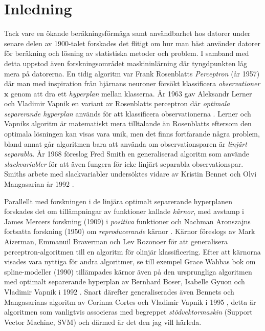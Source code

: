 \documentclass[a4paper, 12pt]{report}
\theoremstyle{definition}
\theoremstyle{remark}
\begin{document}
\chapter{Inledning}
Tack vare en ökande beräkningsförmåga samt användbarhet hos datorer under senare delen av 1900-talet forskades det flitigt om hur man bäst använder datorer för beräkning och lösning av statistiska metoder och problem.
I samband med detta uppstod även forskningsområdet maskininlärning där tyngdpunkten låg mera på datorerna.
En tidig algoritm var Frank Rosenblatts \emph{Perceptron} (år 1957) \cite{Rosenblatt} där man med inspiration från hjärnans neuroner försökt klassificera \emph{observationer} $\mathbf{x}$ genom att dra ett \emph{hyperplan} mellan klasserna.
År 1963 gav Aleksandr Lerner och Vladimir Vapnik en variant av Rosenblatts perceptron där \emph{optimala separerande hyperplan} används för att klassificera observationerna \cite{VapnikLerner1963}.
Lerner och Vapniks algoritm är matematiskt mera tilltalande än Rosenblatts eftersom den optimala lösningen kan visas vara unik, men det finns fortfarande några problem, bland annat går algoritmen bara att använda om observationsparen är \emph{linjärt separabla}.
År 1968 föreslog Fred Smith \cite{Smith} en generaliserad algoritm som använde \emph{slackvariabler} för att även fungera för icke linjärt separabla observationspar.
Smiths arbete med slackvariabler undersöktes vidare av Kristin Bennet och Olvi Mangasarian år 1992 \cite{BennetMangasarian}.

Parallellt med forskningen i de linjära optimalt separerande hyperplanen forskades det om tillämpningar av funktioner kallade \emph{kärnor}, med avstamp i James Mercers forskning (1909) i \emph{positiva} funktioner \cite{Mercer} och Nachman Aronszajns fortsatta forskning (1950) om \emph{reproducerande} kärnor \cite{Aronszajn}.
Kärnor föreslogs av Mark Aizerman, Emmanuil Braverman och Lev Rozonoer \cite{Aizerman} för att generalisera perceptron-algoritmen till en algoritm för olinjär klassificering.
Efter att kärnorna visades vara nyttiga för andra algoritmer, se till exempel Grace Wahbas bok om spline-modeller (1990) \cite{Grace} tillämpades kärnor även på den ursprungliga algoritmen med optimalt separerande hyperplan av Bernhard Boser, Isabelle Gyuon och Vladimir Vapnik i 1992 \cite{BoserGyuonVapnik}.
Snart därefter generaliserades även Bennets och Mangasarians algoritm av Corinna Cortes och Vladimir Vapnik i 1995 \cite{CortesVapnik}, detta är algoritmen som vanligtvis associeras med begreppet \emph{stödvektormaskin} (Support Vector Machine, SVM) och därmed är det den jag vill härleda.
\end{document}
